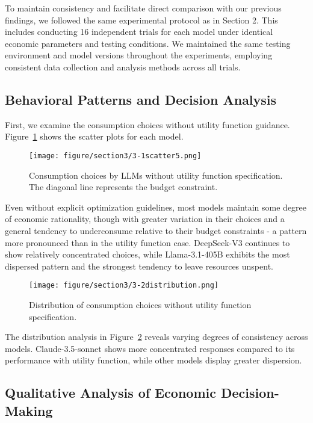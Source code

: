 \documentclass[12pt]{article}
\begin{document}
\begin{CJK*}{UTF8}{gbsn}
To maintain consistency and facilitate direct comparison with our previous findings, we followed the same experimental protocol as in Section 2. This includes conducting 16 independent trials for each model under identical economic parameters and testing conditions. We maintained the same testing environment and model versions throughout the experiments, employing consistent data collection and analysis methods across all trials.

\subsection{Behavioral Patterns and Decision Analysis}

First, we examine the consumption choices without utility function guidance. Figure~\ref{fig:scatter_noutility} shows the scatter plots for each model.

\begin{figure}[htbp]
    \centering
    \texttt{[image: figure/section3/3-1scatter5.png]}
    \caption{Consumption choices by LLMs without utility function specification. The diagonal line represents the budget constraint.}
    \label{fig:scatter_noutility}
\end{figure}

Even without explicit optimization guidelines, most models maintain some degree of economic rationality, though with greater variation in their choices and a general tendency to underconsume relative to their budget constraints - a pattern more pronounced than in the utility function case. DeepSeek-V3 continues to show relatively concentrated choices, while Llama-3.1-405B exhibits the most dispersed pattern and the strongest tendency to leave resources unspent.


\begin{figure}[htbp]
    \centering
    \texttt{[image: figure/section3/3-2distribution.png]}
    \caption{Distribution of consumption choices without utility function specification.}
    \label{fig:dist_noutility}
\end{figure}

The distribution analysis in Figure~\ref{fig:dist_noutility} reveals varying degrees of consistency across models. Claude-3.5-sonnet shows more concentrated responses compared to its performance with utility function, while other models display greater dispersion.

\subsection{Qualitative Analysis of Economic Decision-Making}


\end{CJK*}
\end{document}
